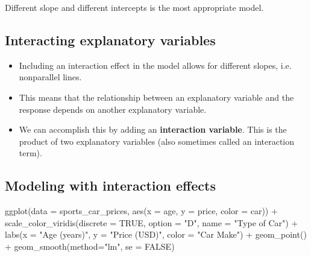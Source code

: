 \documentclass[
]{article}
\newenvironment{Shaded}{\begin{snugshade}}{\end{snugshade}}
\newcommand{\AttributeTok}[1]{\textcolor[rgb]{0.77,0.63,0.00}{#1}}
\newcommand{\ConstantTok}[1]{\textcolor[rgb]{0.00,0.00,0.00}{#1}}
\newcommand{\FunctionTok}[1]{\textcolor[rgb]{0.00,0.00,0.00}{#1}}
\newcommand{\NormalTok}[1]{#1}
\newcommand{\SpecialCharTok}[1]{\textcolor[rgb]{0.00,0.00,0.00}{#1}}
\newcommand{\StringTok}[1]{\textcolor[rgb]{0.31,0.60,0.02}{#1}}
\begin{document}
Different slope and different intercepts is the most appropriate model.

\hypertarget{interacting-explanatory-variables}{%
\subsection{Interacting explanatory
variables}\label{interacting-explanatory-variables}}

\begin{itemize}
\item
  Including an interaction effect in the model allows for different
  slopes, i.e.~ nonparallel lines.
\item
  This means that the relationship between an explanatory variable and
  the response depends on another explanatory variable.
\item
  We can accomplish this by adding an \textbf{interaction variable}.
  This is the product of two explanatory variables (also sometimes
  called an interaction term).
\end{itemize}

\hypertarget{modeling-with-interaction-effects}{%
\subsection{Modeling with interaction
effects}\label{modeling-with-interaction-effects}}

\begin{Shaded}
\begin{Highlighting}[]
\FunctionTok{ggplot}\NormalTok{(}\AttributeTok{data =}\NormalTok{ sports\_car\_prices, }
       \FunctionTok{aes}\NormalTok{(}\AttributeTok{x =}\NormalTok{ age, }\AttributeTok{y =}\NormalTok{ price, }\AttributeTok{color =}\NormalTok{ car)) }\SpecialCharTok{+} 
    \FunctionTok{scale\_color\_viridis}\NormalTok{(}\AttributeTok{discrete =} \ConstantTok{TRUE}\NormalTok{, }\AttributeTok{option =} \StringTok{"D"}\NormalTok{, }\AttributeTok{name =} \StringTok{"Type of Car"}\NormalTok{) }\SpecialCharTok{+} 
  \FunctionTok{labs}\NormalTok{(}\AttributeTok{x =} \StringTok{"Age (years)"}\NormalTok{, }\AttributeTok{y =} \StringTok{"Price (USD)"}\NormalTok{, }\AttributeTok{color =} \StringTok{"Car Make"}\NormalTok{) }\SpecialCharTok{+} 
  \FunctionTok{geom\_point}\NormalTok{() }\SpecialCharTok{+} 
  \FunctionTok{geom\_smooth}\NormalTok{(}\AttributeTok{method=}\StringTok{"lm"}\NormalTok{, }\AttributeTok{se =} \ConstantTok{FALSE}\NormalTok{) }
\end{Highlighting}
\end{Shaded}
\end{document}
